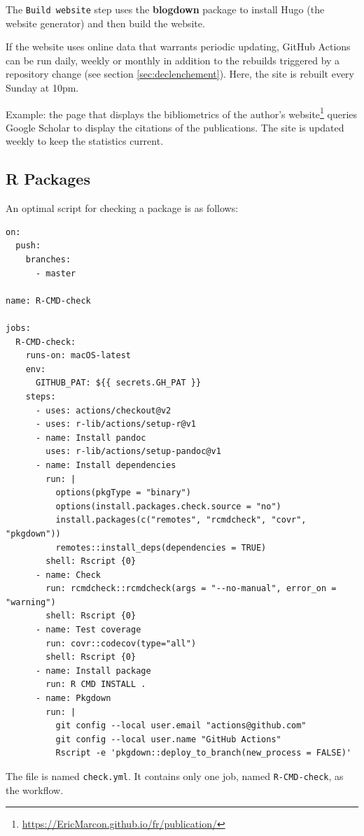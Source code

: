 \documentclass[
  12pt,
  american,
  a4paper,
  extrafontsizes,onecolumn,openright
  ]{memoir}
\begin{document}
The \texttt{Build\ website} step uses the \textbf{blogdown} package to install Hugo (the website generator) and then build the website.

If the website uses online data that warrants periodic updating, GitHub Actions can be run daily, weekly or monthly in addition to the rebuilds triggered by a repository change (see section \ref{sec:declenchement}).
Here, the site is rebuilt every Sunday at 10pm.

Example: the page that displays the bibliometrics of the author's website\footnote{\url{https://EricMarcon.github.io/fr/publication/}} queries Google Scholar to display the citations of the publications.
The site is updated weekly to keep the statistics current.

\hypertarget{sec:package-ci6}{%
\subsection{R Packages}\label{sec:package-ci6}}

An optimal script for checking a package is as follows:

\begin{verbatim}
on:
  push:
    branches:
      - master

name: R-CMD-check

jobs:
  R-CMD-check:
    runs-on: macOS-latest
    env:
      GITHUB_PAT: ${{ secrets.GH_PAT }}
    steps:
      - uses: actions/checkout@v2
      - uses: r-lib/actions/setup-r@v1
      - name: Install pandoc
        uses: r-lib/actions/setup-pandoc@v1
      - name: Install dependencies
        run: |
          options(pkgType = "binary")
          options(install.packages.check.source = "no")
          install.packages(c("remotes", "rcmdcheck", "covr", "pkgdown"))
          remotes::install_deps(dependencies = TRUE)
        shell: Rscript {0}
      - name: Check
        run: rcmdcheck::rcmdcheck(args = "--no-manual", error_on = "warning")
        shell: Rscript {0}
      - name: Test coverage
        run: covr::codecov(type="all")
        shell: Rscript {0}
      - name: Install package
        run: R CMD INSTALL .
      - name: Pkgdown
        run: |
          git config --local user.email "actions@github.com"
          git config --local user.name "GitHub Actions"
          Rscript -e 'pkgdown::deploy_to_branch(new_process = FALSE)'
\end{verbatim}

The file is named \texttt{check.yml}.
It contains only one job, named \texttt{R-CMD-check}, as the workflow.
\end{document}
